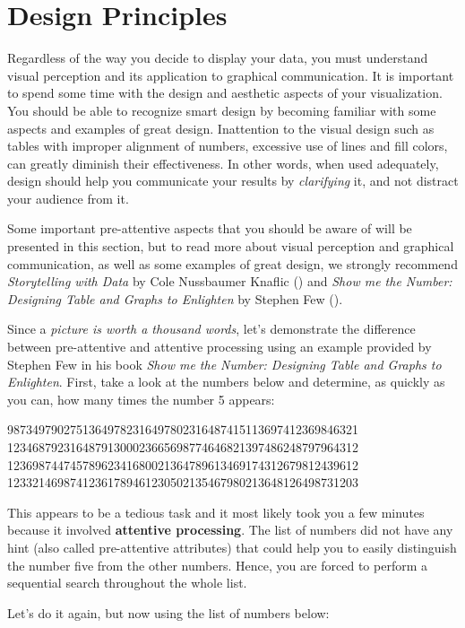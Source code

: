 \documentclass[
]{krantz}
\begin{document}
\hypertarget{design-principles}{%
\section{Design Principles}\label{design-principles}}

Regardless of the way you decide to display your data, you must understand visual perception and its application to graphical communication. It is important to spend some time with the design and aesthetic aspects of your visualization. You should be able to recognize smart design by becoming familiar with some aspects and examples of great design. Inattention to the visual design such as tables with improper alignment of numbers, excessive use of lines and fill colors, can greatly diminish their effectiveness. In other words, when used adequately, design should help you communicate your results by \emph{clarifying} it, and not distract your audience from it.

Some important pre-attentive aspects that you should be aware of will be presented in this section, but to read more about visual perception and graphical communication, as well as some examples of great design, we strongly recommend \emph{Storytelling with Data} by Cole Nussbaumer Knaflic (\citet{Knaflic2015}) and \emph{Show me the Number: Designing Table and Graphs to Enlighten} by Stephen Few (\citet{Few2012}).

Since a \emph{picture is worth a thousand words}, let's demonstrate the difference between pre-attentive and attentive processing using an example provided by Stephen Few in his book \emph{Show me the Number: Designing Table and Graphs to Enlighten}. First, take a look at the numbers below and determine, as quickly as you can, how many times the number 5 appears:

98734979027513649782316497802316487415113697412369846321
12346879231648791300023665698774646821397486248797964312
12369874474578962341680021364789613469174312679812439612
12332146987412361789461230502135467980213648126498731203

This appears to be a tedious task and it most likely took you a few minutes because it involved \textbf{attentive processing}. The list of numbers did not have any hint (also called pre-attentive attributes) that could help you to easily distinguish the number five from the other numbers. Hence, you are forced to perform a sequential search throughout the whole list.

Let's do it again, but now using the list of numbers below:
\end{document}
